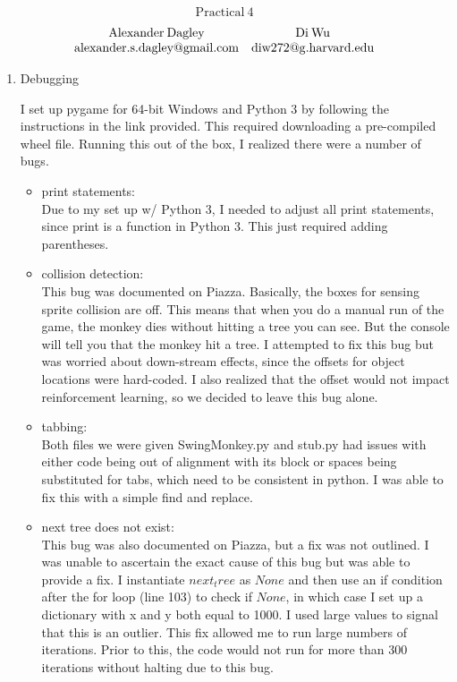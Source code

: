 \documentclass[12pt]{article}
\newcommand\tab[1][0.5cm]{\hspace*{#1}}
\begin{document}
\begin{align*}
\mathrm{Practical \:4}
\end{align*}
$$
\begin{array}{c  c  c}
\mathrm{Alexander \: Dagley} & \mathrm{Di \: Wu} \\
\mathrm{alexander.s.dagley@gmail.com} & \mathrm{diw272@g.harvard.edu}\\
\end{array}
$$

\begin{enumerate}
\item
Debugging

\tab I set up pygame for 64-bit Windows and Python 3 by following the instructions in the link provided.  This required downloading a pre-compiled wheel file.  Running this out of the box, I realized there were a number of bugs. 
	\begin{itemize}
		\item print statements: \\
			\tab Due to my set up w/ Python 3, I needed to adjust all print statements, since print is a function in Python 3.  This just required adding parentheses.
		\item collision detection: \\
			\tab This bug was documented on Piazza.  Basically, the boxes for sensing sprite collision are off.  This means that when you do a manual run of the game, the monkey dies without hitting a tree you can see.  But the console will tell you that the monkey hit a tree.  I attempted to fix this bug but was worried about down-stream effects, since the offsets for object locations were hard-coded.  I also realized that the offset would not impact reinforcement learning, so we decided to leave this bug alone.
		\item tabbing: \\
			\tab Both files we were given SwingMonkey.py and stub.py had issues with either code being out of alignment with its block or spaces being substituted for tabs, which need to be consistent in python.  I was able to fix this with a simple find and replace.
		\item next tree does not exist: \\
			\tab This bug was also documented on Piazza, but a fix was not outlined.  I was unable to ascertain the exact cause of this bug but was able to provide a fix.  I instantiate $next_tree$ as $None$ and then use an if condition after the for loop (line 103) to check if $None$, in which case I set up a dictionary with x and y both equal to 1000.  I used large values to signal that this is an outlier.  This fix allowed me to run large numbers of iterations.  Prior to this, the code would not run for more than 300 iterations without halting due to this bug.
	\end{itemize}


\end{enumerate}
\end{document}
